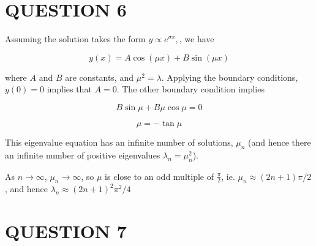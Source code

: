 \documentclass[a4paper]{article}
\begin{document}
\section{QUESTION 6}

Assuming the solution takes the form $ y \propto e^{\sigma x},$, we have

\[ y(x) = A \cos(\mu x) + B \sin(\mu x) \]

where $ A $ and $ B $ are constants, and $ \mu^{2} = \lambda $. Applying the boundary conditions, $ y(0) = 0 $ implies that $ A = 0 $. The other boundary condition implies

\[ B \sin \mu + B \mu \cos \mu = 0 \]

\[  \mu = - \tan \mu  \] 

This eigenvalue equation has an infinite number of solutions, $ \mu_{n} $ (and hence there an infinite number of positive eigenvalues $ \lambda_{n} = \mu_{n}^{2} $).

As $ n \to \infty $, $ \mu_{n} \to \infty $, so $ \mu $ is close to an odd multiple of $\frac{\pi}{2} $, ie. $ \mu_{n} \approx (2n+1)\pi/2 $, and hence $ \lambda_{n} \approx (2n+1)^{2}\pi^{2} / 4 $


\section{QUESTION 7}
\end{document}
